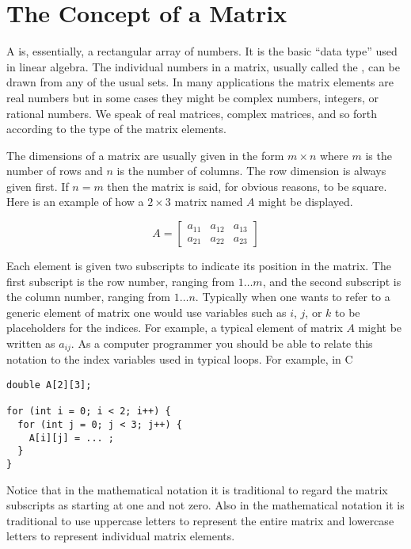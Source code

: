 
\section{The Concept of a Matrix}
\label{sec:matrix-concept}

A  is, essentially, a rectangular array of numbers. It is the basic ``data
type'' used in linear algebra. The individual numbers in a matrix, usually called the
, can be drawn from any of the usual sets. In many applications the matrix
elements are real numbers but in some cases they might be complex numbers, integers, or rational
numbers. We speak of real matrices, complex matrices, and so forth according to the type of the
matrix elements.

The dimensions of a matrix are usually given in the form $m \times n$ where $m$ is the number of
rows and $n$ is the number of columns. The row dimension is always given first. If $n = m$ then
the matrix is said, for obvious reasons, to be square. Here is an example of how a $2 \times 3$
matrix named $A$ might be displayed.

\begin{displaymath}
A = \left[
\begin{array}{ccc}
a_{11} & a_{12} & a_{13} \\
a_{21} & a_{22} & a_{23}
\end{array}
    \right]
\end{displaymath}

Each element is given two subscripts to indicate its position in the matrix. The first subscript
is the row number, ranging from $1\ldots m$, and the second subscript is the column number,
ranging from $1\ldots n$. Typically when one wants to refer to a generic element of matrix one
would use variables such as $i$, $j$, or $k$ to be placeholders for the indices. For example, a
typical element of matrix $A$ might be written as $a_{ij}$. As a computer programmer you should
be able to relate this notation to the index variables used in typical loops. For example, in C
\begin{verbatim}
double A[2][3];

for (int i = 0; i < 2; i++) {
  for (int j = 0; j < 3; j++) {
    A[i][j] = ... ;
  }
}
\end{verbatim}

Notice that in the mathematical notation it is traditional to regard the matrix subscripts as
starting at one and not zero. Also in the mathematical notation it is traditional to use
uppercase letters to represent the entire matrix and lowercase letters to represent individual
matrix elements.

